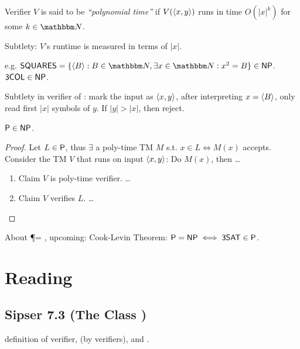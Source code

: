 \documentclass{article}
\begin{document}
\begin{definition}
  Verifier \(V\) is said to be {\it ``polynomial time''} if \(V(\encoding{x, y})\) runs in time \(O(|x|^k)\) for some \(k \in \N\).
\end{definition}

\begin{remark}
  Subtlety: \(V\)'s runtime is measured in terms of \(|x|\).
\end{remark}


e.g. \( \prob{SQUARES} = \setof{\encoding{B} : B \in \N, \exists x \in \N: x^2 = B } \in \NP \). \( \prob{3COL} \in \NP \).

Subtlety in verifier of : mark the input as \(\encoding{x, y}\), after interpreting \(x = \encoding{B}\), only read first \(|x|\) symbols of \(y\). If \(|y| > |x|\), then reject.

\begin{theorem}
  \( \P \in \NP \).
\end{theorem}

\begin{proof}
  Let \(L \in \P\), thus \(\exists\) a poly-time TM \(M\) s.t. \(x \in L \iff M(x) \) accepts.
  Consider the TM \(V\) that runs on input \(\encoding{x, y}\): Do \(M(x)\), then \ldots
  \begin{enumerate}
    \item Claim \(V\) is poly-time verifier. \ldots
    \item Claim \(V\) verifies \(L\). \ldots
  \end{enumerate}
\end{proof}

About \P = \NP, upcoming: Cook-Levin Theorem: \( \P = \NP \iff \prob{3SAT} \in \P \).

\section{Reading}

\subsection{Sipser 7.3 (The Class \NP)}

definition of verifier, \NP (by verifiers), and \NTIME.
\end{document}
